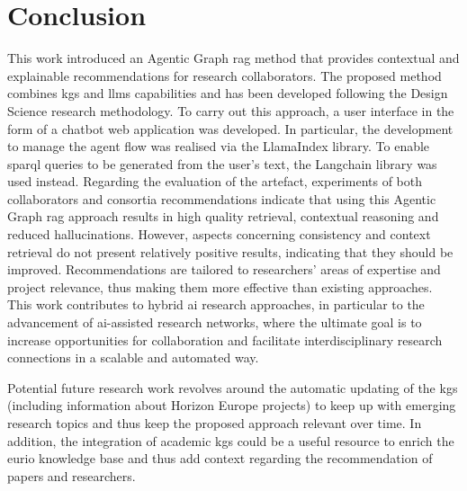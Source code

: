 \chapter{Conclusion}\label{chap:conclusion}
This work introduced an Agentic Graph \gls{rag} method that provides contextual and explainable recommendations for research collaborators.
The proposed method combines \glspl{kg} and \glspl{llm} capabilities and has been developed following the Design Science research methodology.
To carry out this approach, a user interface in the form of a chatbot web application was developed.
In particular, the development to manage the agent flow was realised via the LlamaIndex library.
To enable \gls{sparql} queries to be generated from the user's text, the Langchain library was used instead.
Regarding the evaluation of the artefact, experiments of both collaborators and consortia recommendations indicate that using this Agentic Graph \gls{rag} approach results in high quality retrieval, contextual reasoning and reduced hallucinations.
However, aspects concerning consistency and context retrieval do not present relatively positive results, indicating that they should be improved.
Recommendations are tailored to researchers' areas of expertise and project relevance, thus making them more effective than existing approaches. 
This work contributes to hybrid \gls{ai} research approaches, in particular to the advancement of \gls{ai}-assisted research networks, where the ultimate goal is to increase opportunities for collaboration and facilitate interdisciplinary research connections in a scalable and automated way.

Potential future research work revolves around the automatic updating of the \glspl{kg} (including information about Horizon Europe projects) to keep up with emerging research topics and thus keep the proposed approach relevant over time.
In addition, the integration of academic \glspl{kg} could be a useful resource to enrich the \gls{eurio} knowledge base and thus add context regarding the recommendation of papers and researchers.